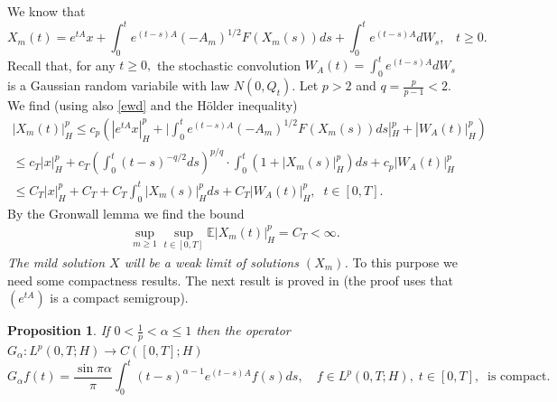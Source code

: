 \documentclass[preprint]{imsart}
\newtheorem{proposition}[theorem]{Proposition}
\def\E{\mathbb E}
\begin{document}
We know that  
 \begin{equation}\label{2ww}
X_m (t)=e^{tA} x +\int_{0}^{t}e^{\left(  t-s\right)  A} (-A_m)^{1/2}F^{}(X_m(s))
ds+\int_{0}^{t}e^{\left(  t-s\right)  A}dW_{s},\;\;\; t \ge 0.
\end{equation}
Recall    that, for any $t \ge 0,$ the stochastic convolution $W_A(t)= \int_{0}^{t}e^{\left(  t-s\right)  A}dW_{s}$ is a Gaussian random variabile with law $N(0,Q_t)$.  Let $p > 2$ and $q = \frac{p}{p-1} <2$.  We find (using also \eqref{ewd} {   and the H\"older inequality) }
\begin{gather*}
|X_m (t)|^p_H \le c_p ( |e^{tA} x|^p_H + \big | \int_{0}^{t}e^{\left(  t-s\right)  A} (-A_m)^{1/2}F^{}(X_m(s))ds |^p_H +
| W_A(t)|^p_H ) 
\\ \le 
  c_T| x|^p_H +  c_T ( \int_{0}^{t}  (t-s)^{-q/2} ds)^{p/q} \cdot    \int_{0}^{t} (1+ |X_m(s) |_H^p  )  ds  +
c_p | W_A(t)|^p_H 
 \\
\le C_T | x|^p_H + C_T +  C_T  \int_{0}^{t}   |X_m(s) |^p_H ds +
C_T | W_A(t)|^p_H,\;\;  t \in [0,T].  
\end{gather*}
 By the Gronwall lemma we find the bound
\begin{equation} \label{sd1}
\begin{array}{l}
\sup_{m \ge 1} \sup_{t \in [0,T]}\E|X_m (t)|^p_H = {   C_T } < \infty.
\end{array}  
\end{equation} 
{\sl The mild solution $X$ will be a weak limit of solutions $(X_m)$.} To this purpose we need some compactness results.
 The next  result is proved in \cite{GG} 
(the proof  uses that $(e^{tA})$ is a compact semigroup). 
\begin{proposition}
\label{p8.40}
If
$0<\frac{1}{p}<\alpha \leq 1$ then the
operator $G_{\alpha }: L^{p}(0,T;H) \to C([0,T];H) $
\begin{displaymath}
G_{\alpha }f(t)=\frac{\sin \pi \alpha}{\pi}  \int_{0}^{t}(t-s)^{\alpha -
1} e^{(t-s)A}f(s)ds,\quad f \in L^{p}(0,T;H),\;t \in [0,T], \;\; \text{is compact}. 
\end{displaymath}
 \end{proposition}
\end{document}
